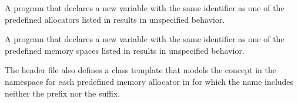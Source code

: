 \begin{ccppspecific}
A program that declares a new variable with the same identifier as one of 
the predefined allocators listed in  
results in unspecified behavior.

A program that declares a new variable with the same identifier as one of 
the predefined memory spaces listed in  
results in unspecified behavior.
\end{ccppspecific}

\begin{cppspecific}
The  header file also defines a class template that
models the  concept in the 
namespace for each predefined memory allocator in
 for which the name includes
neither the  prefix nor the  suffix.
\end{cppspecific}

